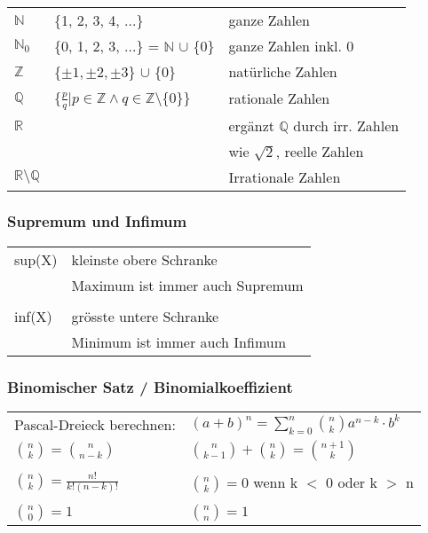 \begin{tabular}{l l l}
    $\mathbb{N}$  & \{1, 2, 3, 4, ...\} & ganze Zahlen \\
    $\mathbb{N}_0$ & \{0, 1, 2, 3, ...\} = $\mathbb{N}$ $\cup$ \{0\} & ganze Zahlen inkl. 0 \\
    $\mathbb{Z}$ & \{$\pm1, \pm2, \pm3 $\} $\cup$ \{0\} & natürliche Zahlen \\
    $\mathbb{Q}$ & \{$ \frac{p}{q} | p \in \mathbb{Z} \wedge q \in \mathbb{Z} \setminus $\{0\}\} & rationale Zahlen \\
    $\mathbb{R}$ & & ergänzt $\mathbb{Q}$ durch irr. Zahlen \\
                 & & wie $\sqrt{2}$, reelle Zahlen \\
    $\mathbb{R} \setminus \mathbb{Q}$ & & Irrationale Zahlen \\
\end{tabular}

\subsubsection{Supremum und Infimum}
    \begin{tabular}{ll} 
        sup(X) & kleinste obere Schranke  \\
               & Maximum ist immer auch Supremum \\
        \\
        inf(X) &  grösste untere Schranke \\ 
               & Minimum ist immer auch Infimum \\
    \end{tabular}			
        
\subsubsection{Binomischer Satz / Binomialkoeffizient}	
    \begin{tabular}{ll} 
        Pascal-Dreieck berechnen:  & $\left(a+b\right)^n = \sum\limits _{k=0}^n \binom{n}{k}a^{n-k}\cdot b^k$ \\
        $\binom{n}{k}=\binom{n}{n-k}$ & $\binom{n}{k-1}+\binom{n}{k}=\binom{n+1}{k}$ \\
        \\
        $\binom{n}{k}=\frac{n!}{k!\left(n-k\right)!}$ & $\binom{n}{k} = 0$ wenn k $<$ 0 oder k $>$ n \\ 
        \\
        $\binom{n}{0}=1$ &  $\binom{n}{n}=1$ \\ 	 		
    \end{tabular}				 
         
